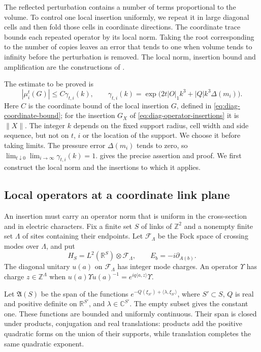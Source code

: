 \documentclass[11pt,letterpaper,reqno]{amsart}
\newcommand{\R}{\mathbb R}
\newcommand{\C}{\mathbb C}
\newcommand{\Z}{\mathbb Z}
\begin{document}
The reflected perturbation contains a number of terms proportional to
the volume. To control one local insertion uniformly, we repeat it
in large diagonal cells and then fold those cells in coordinate
directions. The coordinate trace bounds each repeated operator by
its local norm. Taking the root corresponding to the number of
copies leaves an error that tends to one when volume tends to
infinity before the perturbation is removed. The local norm, insertion
bound and amplification are the constructions of
\cite[Lemma~8.13, Proposition~8.26 and Theorem~8.32]{ChamberQED}.

The estimate to be proved is
\[
 |\mu_i^t(G)|\le C\gamma_{t,i}(k),\qquad
 \gamma_{t,i}(k)=
 \exp\bigl(2t|O|_1k^3+|Q|k^3\Delta(m_i)\bigr).
\]
Here $C$ is the coordinate bound of the local insertion $G$, defined
in \eqref{eq:diag-coordinate-bound}; for the insertion $G_X$ of
\eqref{eq:diag-operator-insertions} it is $\|X\|$.
The integer $k$ depends on the fixed support
radius, cell width and side sequence, but not on $t$, $i$ or the
location of the support. We choose it before taking limits. The
pressure error $\Delta(m_i)$ tends to zero, so
$\lim_{t\downarrow0}\lim_{i\to\infty}\gamma_{t,i}(k)=1$.
 gives the precise assertion and proof.
We first construct the local norm and the insertions to which it applies.

\subsection{Local operators at a coordinate link plane}\label{subsec:diag-local-operators}

An insertion must carry an operator norm that is uniform in the
cross-section and in electric characters. Fix a finite set $S$ of
links of $\Z^2$ and a nonempty finite set $\Lambda$ of sites
containing their endpoints. Let $\mathcal F_\Lambda$ be the Fock
space of crossing modes over $\Lambda$, and put
\[
 H_S=L^2(\R^S)\otimes\mathcal F_\Lambda,
 \qquad E_b=-i\partial_{A(b)}.
\]
The diagonal unitary $u(a)$ on $\mathcal F_\Lambda$ has integer mode
charges. An operator $\Upsilon$ has charge $z\in\Z^\Lambda$ when
$u(a)\Upsilon u(a)^{-1}=e^{iq\langle a,z\rangle}\Upsilon$.

Let $\mathfrak A(S)$ be the span of the functions
$e^{-Q(\xi_{S'})+\langle\lambda,\xi_{S'}\rangle}$, where
$S'\subset S$, $Q$ is real and positive definite on $\R^{S'}$,
and $\lambda\in\C^{S'}$. The empty subset gives the constant one.
These functions are bounded and uniformly continuous. Their span
is closed under products, conjugation and real translations: products
add the positive quadratic forms on the union of their supports,
while translation completes the same quadratic exponent.
\end{document}
